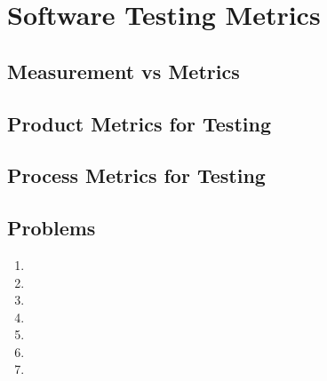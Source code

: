 \chapter{Software Testing Metrics}
\section{Measurement vs Metrics}
\section{Product Metrics for Testing}
\section{Process Metrics for Testing}
\section{Problems}
\begin{enumerate}
    \item 
    \item 
    \item 
    \item 
    \item 
    \item
    \item 
\end{enumerate}